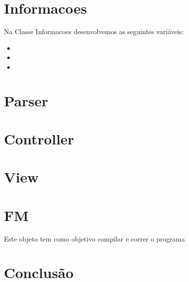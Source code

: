 \documentclass[a4paper,12pt]{article}
\begin{document}
\section{Informacoes}
    Na Classe Informacoes desenvolvemos as seguintes variáveis:
    \begin{itemize}
        \item
        \item
        \item
    \end{itemize}

\section{Parser}

\section{Controller}

\section{View}

\section{FM}
    Este objeto tem como objetivo compilar e correr o programa
\section{Conclusão}
\end{document}
